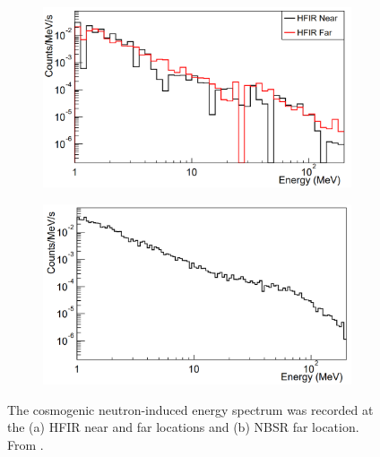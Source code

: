 
\begin{figure}[!h]
\centering
\begin{subfigure}{.5\textwidth}
  \centering
  \includegraphics[width=\linewidth]{Chapter2/Figs/Raster/Prospect_HFIR_nearFarPlot.png}
  \captionsetup{width=.9\linewidth}
  \caption{}
  \label{subFig:Prospect_HFIR_nearFarPlot}
\end{subfigure}%
\begin{subfigure}{.5\textwidth}
  \centering
\includegraphics[width=\linewidth]{Chapter2/Figs/Raster/Prospect_NBSR_farPlot.png}
  \captionsetup{width=.9\linewidth}
  \caption{}
  \label{subFig:Prospect_NBSR_farPlot}
\end{subfigure}
\caption{The cosmogenic neutron-induced energy spectrum was recorded at the (a) HFIR near and far locations and (b) NBSR far location. From \cite{Ashenfelter_2016}.}
\label{fig:Prospect_HFIR_NBSR_nearFarPlots}
\end{figure}

